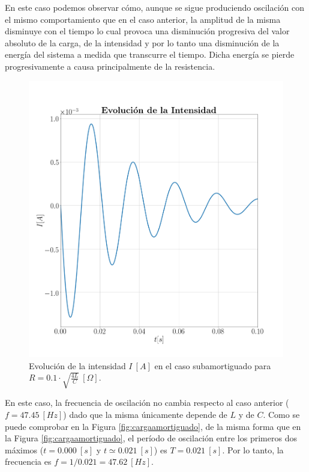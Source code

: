 \documentclass[journal]{IEEEtran}
\begin{document}
En este caso podemos observar cómo, aunque se sigue produciendo oscilación con el mismo comportamiento que en el caso anterior, la amplitud de la misma disminuye con el tiempo lo cual provoca una disminución progresiva del valor absoluto de la carga, de la intensidad y por lo tanto una disminución de la energía del sistema a medida que transcurre el tiempo. Dicha energía se pierde progresivamente a causa principalmente de la resistencia.

\begin{figure}[!htb]
    \centering
    \includegraphics[width=\linewidth,trim={40 70 70 105},clip]{intensidadsubamortiguado.png}
    \caption{Evolución de la intensidad $I~[A]$ en el caso subamortiguado para $R=0.1 \cdot\sqrt{\frac{4L}{C}}~[\Omega]$.}
    \label{fig:intensidadsubamortiguado}
\end{figure}

En este caso, la frecuencia de oscilación no cambia respecto al caso anterior ($f = 47.45~[Hz]$) dado que la misma únicamente depende de $L$ y de $C$. Como se puede comprobar en la Figura \ref{fig:cargaamortiguado}, de la misma forma que en la Figura \ref{fig:cargaamortiguado}, el período de oscilación entre los primeros dos máximos ($t = 0.000~[s]$ y $t \simeq 0.021~[s]$) es $T = 0.021~[s]$. Por lo tanto, la frecuencia es $f = 1/0.021 = 47.62~[Hz]$.
\end{document}

